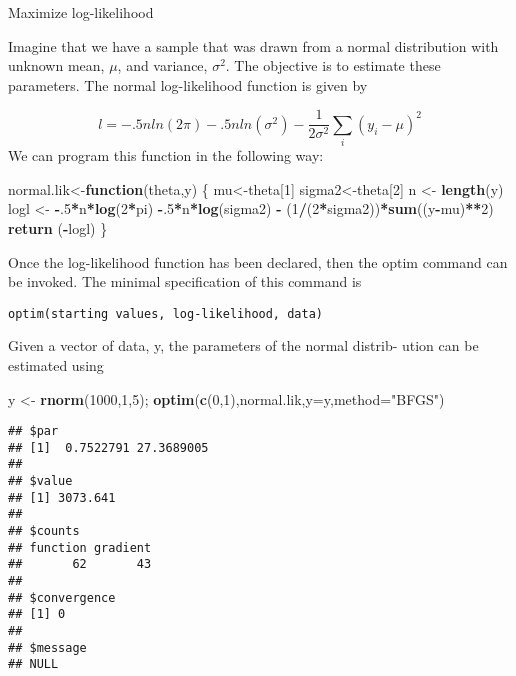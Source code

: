\documentclass[8pt,ignorenonframetext,]{beamer}
\newenvironment{Shaded}{\begin{snugshade}}{\end{snugshade}}
\newcommand{\KeywordTok}[1]{\textcolor[rgb]{0.13,0.29,0.53}{\textbf{#1}}}
\newcommand{\DataTypeTok}[1]{\textcolor[rgb]{0.13,0.29,0.53}{#1}}
\newcommand{\DecValTok}[1]{\textcolor[rgb]{0.00,0.00,0.81}{#1}}
\newcommand{\StringTok}[1]{\textcolor[rgb]{0.31,0.60,0.02}{#1}}
\newcommand{\ControlFlowTok}[1]{\textcolor[rgb]{0.13,0.29,0.53}{\textbf{#1}}}
\newcommand{\OperatorTok}[1]{\textcolor[rgb]{0.81,0.36,0.00}{\textbf{#1}}}
\newcommand{\NormalTok}[1]{#1}
\begin{document}
\begin{frame}[fragile]{Maximize log-likelihood}

Imagine that we have a sample that was drawn from a normal distribution
with unknown mean, \(\mu\), and variance, \(\sigma^2\). The objective is
to estimate these parameters. The normal log-likelihood function is
given by

\[ l = −.5 n ln (2\pi)−.5 n ln(\sigma^2)− \frac{1}{2\sigma^2} \sum_{i} (y_i -\mu)^2 \]
We can program this function in the following way:

\begin{Shaded}
\begin{Highlighting}[]
\NormalTok{normal.lik<-}\ControlFlowTok{function}\NormalTok{(theta,y) \{ }
\NormalTok{  mu<-theta[}\DecValTok{1}\NormalTok{]}
\NormalTok{  sigma2<-theta[}\DecValTok{2}\NormalTok{]}
\NormalTok{  n <-}\StringTok{ }\KeywordTok{length}\NormalTok{(y)}
\NormalTok{  logl <-}\StringTok{ }\OperatorTok{-}\NormalTok{.}\DecValTok{5}\OperatorTok{*}\NormalTok{n}\OperatorTok{*}\KeywordTok{log}\NormalTok{(}\DecValTok{2}\OperatorTok{*}\NormalTok{pi) }\OperatorTok{-}\NormalTok{.}\DecValTok{5}\OperatorTok{*}\NormalTok{n}\OperatorTok{*}\KeywordTok{log}\NormalTok{(sigma2) }\OperatorTok{-}\StringTok{ }\NormalTok{(}\DecValTok{1}\OperatorTok{/}\NormalTok{(}\DecValTok{2}\OperatorTok{*}\NormalTok{sigma2))}\OperatorTok{*}\KeywordTok{sum}\NormalTok{((y}\OperatorTok{-}\NormalTok{mu)}\OperatorTok{**}\DecValTok{2}\NormalTok{) }
  \KeywordTok{return}\NormalTok{ (}\OperatorTok{-}\NormalTok{logl)}
\NormalTok{\}}
\end{Highlighting}
\end{Shaded}

\end{frame}

\begin{frame}[fragile]

Once the log-likelihood function has been declared, then the optim
command can be invoked. The minimal specification of this command is

\texttt{optim(starting\ values,\ log-likelihood,\ data)}

Given a vector of data, y, the parameters of the normal distrib- ution
can be estimated using

\begin{Shaded}
\begin{Highlighting}[]
\NormalTok{y <-}\StringTok{ }\KeywordTok{rnorm}\NormalTok{(}\DecValTok{1000}\NormalTok{,}\DecValTok{1}\NormalTok{,}\DecValTok{5}\NormalTok{);}
\KeywordTok{optim}\NormalTok{(}\KeywordTok{c}\NormalTok{(}\DecValTok{0}\NormalTok{,}\DecValTok{1}\NormalTok{),normal.lik,}\DataTypeTok{y=}\NormalTok{y,}\DataTypeTok{method=}\StringTok{"BFGS"}\NormalTok{)}
\end{Highlighting}
\end{Shaded}

\begin{verbatim}
## $par
## [1]  0.7522791 27.3689005
## 
## $value
## [1] 3073.641
## 
## $counts
## function gradient 
##       62       43 
## 
## $convergence
## [1] 0
## 
## $message
## NULL
\end{verbatim}

\end{frame}
\end{document}

